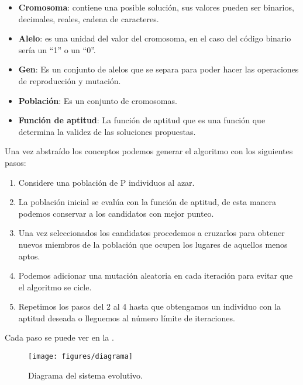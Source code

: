 \documentclass[10pt,twocolumn,a4paper]{articuloAPA}
\begin{document}
\begin{itemize}
  \item \textbf{Cromosoma}: contiene una posible solución, sus valores pueden ser binarios, decimales, reales, cadena de caracteres.
  \item \textbf{Alelo}: es una unidad del valor del cromosoma, en el caso del código binario sería un ``1'' o un ``0''.
  \item \textbf{Gen}: Es un conjunto de alelos que se separa para poder hacer las operaciones de reproducción y mutación.
  \item \textbf{Población}: Es un conjunto de cromosomas.
  \item \textbf{Función de aptitud}: La función de aptitud que es una función que determina la validez de las soluciones propuestas.
\end{itemize} 


Una vez abstraído los conceptos podemos generar el algoritmo con los siguientes pasos:

\begin{enumerate}
  \item Considere una población de P individuos al azar.
  \item La población inicial se evalúa con la función de aptitud, de esta manera podemos conservar a los candidatos con mejor punteo.
  \item 	Una vez seleccionados los candidatos procedemos a cruzarlos para obtener nuevos miembros de la población que ocupen los lugares de aquellos menos aptos.
  \item Podemos adicionar una mutación aleatoria en cada iteración para evitar que el algoritmo se cicle.
  \item Repetimos los pasos del 2 al 4 hasta que obtengamos un individuo con la aptitud deseada o lleguemos al número límite de iteraciones.
\end{enumerate}

Cada paso se puede ver en la .

\begin{figure}
  \centering
  \texttt{[image: figures/diagrama]}
  \decoRule
  \caption[Diagrama del sistema evolutivo. ]{Diagrama del sistema evolutivo.}
  \label{fig:diagrama}
\end{figure}
\end{document}
